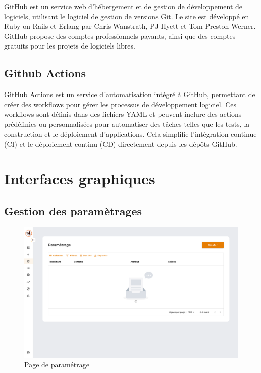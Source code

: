 \noindent GitHub est un service web d'hébergement et de gestion de développement de logiciels, utilisant le logiciel de gestion de versions Git. Le site est développé en Ruby on Rails et Erlang par Chris Wanstrath, PJ Hyett et Tom Preston-Werner. GitHub propose des comptes professionnels payants, ainsi que des comptes gratuits pour les projets de logiciels libres. 

\subsection{Github Actions}


\noindent GitHub Actions est un service d'automatisation intégré à GitHub, permettant de créer des workflows pour gérer les processus de développement logiciel. Ces workflows sont définis dans des fichiers YAML et peuvent inclure des actions prédéfinies ou personnalisées pour automatiser des tâches telles que les tests, la construction et le déploiement d'applications. Cela simplifie l'intégration continue (CI) et le déploiement continu (CD) directement depuis les dépôts GitHub.

\clearpage


\section{Interfaces graphiques}

\subsection{Gestion des paramètrages}

\begin{figure}[H]
    \centering
    \includegraphics[width=\textwidth]{images/parametrage.png}
    \caption{Page de paramétrage}
\end{figure}

